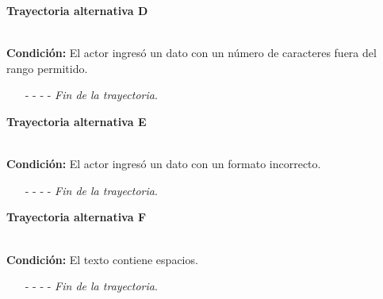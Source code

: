 \hypertarget{CU12-1-2-2:TAD}{\textbf{Trayectoria alternativa D}}\\
\noindent \textbf{Condición:} El actor ingresó un dato con un número de caracteres fuera del rango permitido.
\begin{enumerate}
	\UCpaso[\UCsist] Muestra el mensaje  señalando el campo que presenta el error en la pantalla .
	\UCpaso Regresa al paso \ref{CU12.1.2.2-P3} de la trayectoria principal.
	\item[- -] - - {\em {Fin de la trayectoria}}.%
\end{enumerate}
\hypertarget{CU12-1-2-2:TAE}{\textbf{Trayectoria alternativa E}}\\
\noindent \textbf{Condición:} El actor ingresó un dato con un formato incorrecto.
\begin{enumerate}
	\UCpaso[\UCsist] Muestra el mensaje  señalando el campo que presenta el error en la pantalla .
	\UCpaso Regresa al paso \ref{CU12.1.2.2-P3} de la trayectoria principal.
	\item[- -] - - {\em {Fin de la trayectoria}}.
\end{enumerate}
\hypertarget{CU12-1-2-2:TAF}{\textbf{Trayectoria alternativa F}}\\
\noindent \textbf{Condición:} El texto contiene espacios.
\begin{enumerate}
	\UCpaso[\UCsist] Sustituye los espacios por guiones bajos.
	\UCpaso Continua en el paso \ref{CU12.1.2.2-TA1} de la trayectoria alternativa A.
	\item[- -] - - {\em {Fin de la trayectoria}}.
\end{enumerate}